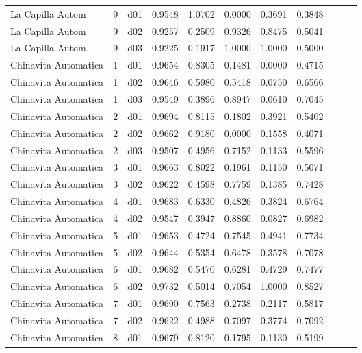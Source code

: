 \begin{landscape}
\begin{longtable}{p{5cm}rrrrrrrrrr}
     La Capilla Autom  & 9 &     d01 &   0.9548 &  1.0702 &    0.0000 &   0.3691 &    0.3848 \\
     La Capilla Autom  & 9 &     d02 &   0.9257 &  0.2509 &    0.9326 &   0.8475 &    0.5041 \\
     La Capilla Autom  & 9 &     d03 &   0.9225 &  0.1917 &    1.0000 &   1.0000 &    0.5000 \\
 Chinavita Automatica  & 1 &     d01 &   0.9654 &  0.8305 &    0.1481 &   0.0000 &    0.4715 \\
 Chinavita Automatica  & 1 &     d02 &   0.9646 &  0.5980 &    0.5418 &   0.0750 &    0.6566 \\
 Chinavita Automatica  & 1 &     d03 &   0.9549 &  0.3896 &    0.8947 &   0.0610 &    0.7045 \\
 Chinavita Automatica  & 2 &     d01 &   0.9694 &  0.8115 &    0.1802 &   0.3921 &    0.5402 \\
 Chinavita Automatica  & 2 &     d02 &   0.9662 &  0.9180 &    0.0000 &   0.1558 &    0.4071 \\
 Chinavita Automatica  & 2 &     d03 &   0.9507 &  0.4956 &    0.7152 &   0.1133 &    0.5596 \\
 Chinavita Automatica  & 3 &     d01 &   0.9663 &  0.8022 &    0.1961 &   0.1150 &    0.5071 \\
 Chinavita Automatica  & 3 &     d02 &   0.9622 &  0.4598 &    0.7759 &   0.1385 &    0.7428 \\
 Chinavita Automatica  & 4 &     d01 &   0.9683 &  0.6330 &    0.4826 &   0.3824 &    0.6764 \\
 Chinavita Automatica  & 4 &     d02 &   0.9547 &  0.3947 &    0.8860 &   0.0827 &    0.6982 \\
 Chinavita Automatica  & 5 &     d01 &   0.9653 &  0.4724 &    0.7545 &   0.4941 &    0.7734 \\
 Chinavita Automatica  & 5 &     d02 &   0.9644 &  0.5354 &    0.6478 &   0.3578 &    0.7078 \\
 Chinavita Automatica  & 6 &     d01 &   0.9682 &  0.5470 &    0.6281 &   0.4729 &    0.7477 \\
 Chinavita Automatica  & 6 &     d02 &   0.9732 &  0.5014 &    0.7054 &   1.0000 &    0.8527 \\
 Chinavita Automatica  & 7 &     d01 &   0.9690 &  0.7563 &    0.2738 &   0.2117 &    0.5817 \\
 Chinavita Automatica  & 7 &     d02 &   0.9622 &  0.4988 &    0.7097 &   0.3774 &    0.7092 \\
 Chinavita Automatica  & 8 &     d01 &   0.9679 &  0.8120 &    0.1795 &   0.1130 &    0.5199 \\

\end{longtable}
\end{landscape}
